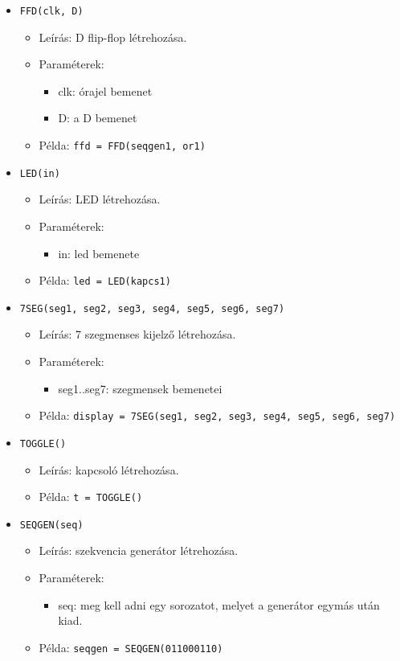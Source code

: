 \begin{itemize}
\item \texttt{FFD(clk, D)}
	\begin{itemize}
	\item Leírás: D flip-flop létrehozása.
	\item Paraméterek: 
		\begin{itemize}
			\item clk: órajel bemenet
			\item D: a D bemenet
		\end{itemize}
	\item Példa: \texttt{ffd = FFD(seqgen1, or1)}
	\end{itemize}
	
\item \texttt{LED(in)}
	\begin{itemize}
	\item Leírás: LED létrehozása.
	\item Paraméterek: 
		\begin{itemize}
			\item in: led bemenete
		\end{itemize}
	\item Példa: \texttt{led = LED(kapcs1)}
	\end{itemize}

\item \texttt{7SEG(seg1, seg2, seg3, seg4, seg5, seg6, seg7)}
	\begin{itemize}
	\item Leírás: 7 szegmenses kijelző létrehozása.
	\item Paraméterek: 
		\begin{itemize}
			\item seg1..seg7: szegmensek bemenetei
		\end{itemize}
	\item Példa: \texttt{display = 7SEG(seg1, seg2, seg3, seg4, seg5, seg6, seg7)}
	\end{itemize}
	
\item \texttt{TOGGLE()}
	\begin{itemize}
	\item Leírás: kapcsoló létrehozása.
	\item Példa: \texttt{t = TOGGLE()}
	\end{itemize}		

\item \texttt{SEQGEN(seq)}
	\begin{itemize}
	\item Leírás: szekvencia generátor létrehozása.
	\item Paraméterek: 
		\begin{itemize}
			\item seq: meg kell adni egy sorozatot, melyet a generátor egymás után kiad.
		\end{itemize}
	\item Példa: \texttt{seqgen = SEQGEN(011000110)}
	\end{itemize}


\end{itemize}
